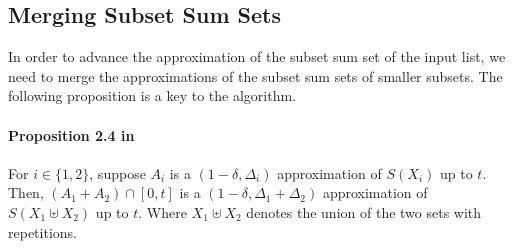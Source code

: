 \subsection{Merging Subset Sum Sets}

In order to advance the approximation of the subset sum set of the input list, we need to merge the approximations of the subset sum sets of smaller subsets. The following proposition is a key to the algorithm.

\paragraph{Proposition 2.4 in \cite{deng}} 

For \(i \in \{1, 2\}\), suppose \(A_i\) is a \((1 - \delta, \Delta_i)\) approximation of \(S(X_i)\) up to \(t\). Then, \((A_1 + A_2) \cap [0, t]\) is a \((1 - \delta, \Delta_1 + \Delta_2)\) approximation of \(S(X_1 \uplus X_2)\) up to \(t\). Where \(X_1 \uplus X_2\) denotes the union of the two sets with repetitions.